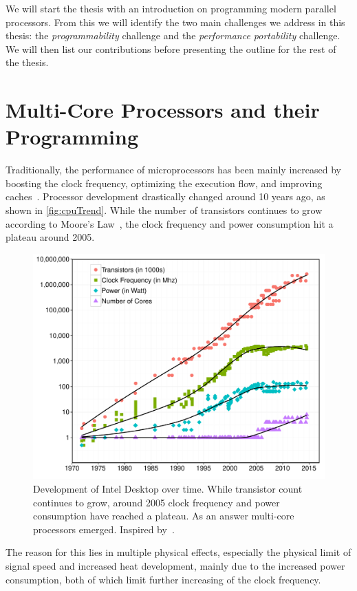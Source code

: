 \noindent
We will start the thesis with an introduction on programming modern parallel processors.
From this we will identify the two main challenges we address in this thesis:
the \emph{programmability} challenge and the \emph{performance portability} challenge.
We will then list our contributions before presenting the outline for the rest of the thesis.

\section{Multi-Core Processors and their Programming}

Traditionally, the performance of microprocessors has been mainly increased by boosting the clock frequency, optimizing the execution flow, and improving caches~\cite{Sutter2005}.
Processor development drastically changed around 10 years ago, as shown in \autoref{fig:cpuTrend}.
While the number of transistors continues to grow according to Moore's Law~\cite{Moore1998}, the clock frequency and power consumption hit a plateau around 2005.
\begin{figure}
  \centering
  \includegraphics[height=.30\paperheight]{Figures/intelCPUTrend}
  \caption[Development of Intel Desktop \CPUs over time]{Development of Intel Desktop \CPUs over time. While transistor count continues to grow, around 2005 clock frequency and power consumption have reached a plateau. As an answer multi-core processors emerged. Inspired by~\cite{Sutter2005}.}
  \label{fig:cpuTrend}
\end{figure}
The reason for this lies in multiple physical effects, especially the physical limit of signal speed and increased heat development,  mainly due to the increased power consumption, both of which limit further increasing of the clock frequency.
